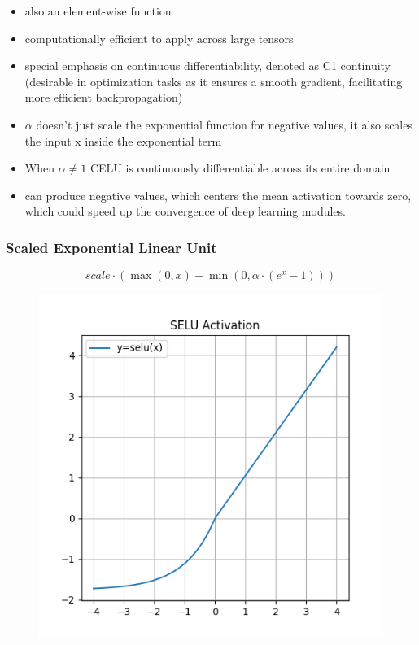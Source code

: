 \documentclass[11pt]{article}
\begin{document}
\begin{itemize}
    \item also an element-wise function
    \item computationally efficient to     apply across large tensors
    \item special emphasis on continuous differentiability, denoted as C1 continuity (desirable in optimization tasks as it ensures a smooth gradient, facilitating more efficient backpropagation)
    \item $\alpha$ doesn't just scale the exponential function for negative values, it also scales the input x inside the exponential term
    \item When $\alpha \neq 1$ CELU is continuously differentiable across its entire domain 
    \item can produce negative values, which centers the mean activation towards zero, which could speed up the convergence of deep learning modules.
\end{itemize}

\subsubsection{Scaled Exponential Linear Unit}

\begin{definition}\label{eq:activation-selu}
    \begin{equation*}
        scale \cdot (\max(0,x) + \min(0,\alpha \cdot (e^{x} - 1)))
    \end{equation*}
\end{definition}

\begin{figure}[H]
    \centering
    \includegraphics*[width=.4\linewidth]{figures/SELU Activation.png}\label{fig:selu}
\end{figure}
\end{document}
